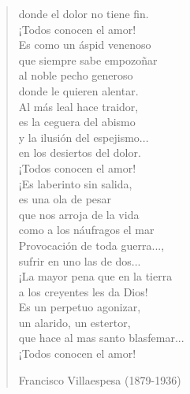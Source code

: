 \documentclass[12pt, twoside]{book}
\begin{document}
\begin{verse}
donde el dolor no tiene fin.\\
¡Todos conocen el amor!\\
Es como un áspid venenoso\\
que siempre sabe empozoñar\\
al noble pecho generoso\\
donde le quieren alentar.\\
Al más leal hace traidor,\\
es la ceguera del abismo\\
y la ilusión del espejismo...\\
en los desiertos del dolor.\\
¡Todos conocen el amor!\\
¡Es laberinto sin salida,\\
es una ola de pesar\\
que nos arroja de la vida\\
como a los náufragos el mar\\
Provocación de toda guerra...,\\
sufrir en uno las de dos...\\
¡La mayor pena que en la tierra\\
a los creyentes les da Dios!\\
Es un perpetuo agonizar,\\
un alarido, un estertor,\\
que hace al mas santo blasfemar...\\
¡Todos conocen el amor!\newline

Francisco Villaespesa (1879-1936)
\end{verse}
\newpage
\end{document}
